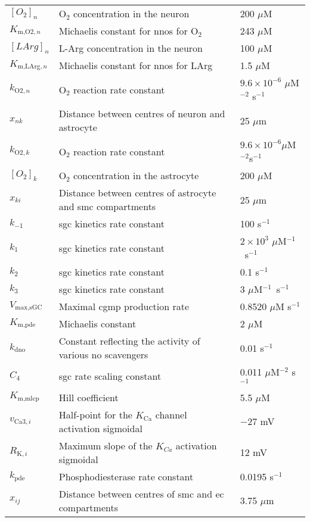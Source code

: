 \documentclass[11pt]{elsarticle}
\newcommand{\mus}{$\mu$M s$^{-1}$\xspace}
\newcommand{\ox}{O$_2$\xspace}
\newcommand{\uM}{$\mu$M\xspace}
\newcommand{\um}{$\mu$m\xspace}
\newcommand{\n}{$^{-1}$\xspace}
\newcommand{\e}[1]{\times 10^{#1}}
\newcommand{\psec}{s$^{-1}$\xspace}
\begin{document}
\begin{longtable}[h!]{ p{0.12\linewidth}   p{0.64\linewidth}   p{0.24\linewidth} }
$ [O_2]_n $ 				& \ox concentration in the neuron 					& 200 \uM 	\\
$ K_{\text{m,O2},n} $ 		& Michaelis constant for \gls{nnos} for \ox  				& 243 \uM \\
$ [LArg]_n $ 				& L-Arg concentration in the neuron 					& 100 \uM 	\\ 
$ K_{\text{m,LArg},n} $ 	& Michaelis constant for \gls{nnos} for LArg 				& 1.5 \uM 	 \\
$ k_{\text{O2},n} $ 		& \ox reaction rate constant							& $9.6\e{-6}$ \uM$^{-2}$ s\n \\
$ x_{nk} $ 					& Distance between centres of neuron and astrocyte  	& 25 \um  \\ 
$ k_{\text{O2},k} $ 	& \ox reaction rate constant							& $9.6\e{-6}$\uM$^{-2}$s\n \\ 
$[O_2]_k$ 				& \ox concentration in the astrocyte & 200 \uM \\
$ x_{ki} $ 				& Distance between centres of astrocyte and \gls{smc} compartments 	& 25 \um \\ 
$ k_{-1} $ 				& \gls{sgc} kinetics rate constant 	& 100 s\n 			 \\ 
$ k_1 $ 				& \gls{sgc} kinetics rate constant 	& $2\e{3}$ \uM\n\ s\n 	 \\ 
$ k_2 $ 				& \gls{sgc} kinetics rate constant 	& 0.1 s\n 			 \\ 
$ k_3 $ 				& \gls{sgc} kinetics rate constant 	& 3 \uM\n\ s\n 		 \\ 
$ V_{\text{max,sGC}} $ 	& Maximal \gls{cgmp} production rate	& 0.8520 \mus  	 \\ 
$ K_{\text{m,pde}} $ 	& Michaelis constant 			& 2 \uM 			 \\ 
$ k_{\text{dno}}$ 		& Constant reflecting the activity of various \gls{no} scavengers & 0.01 s\n \\ 
$ C_4 $ 				& \gls{sgc} rate scaling constant 						& 0.011 \uM$^{-2}$ \psec \\ 
$ K_{\text{m,mlcp}} $ 	& Hill coefficient				& 5.5 \uM 			 \\
$ v_{\text{Ca}3,i} $ 			& Half-point for the $ K_{\text{Ca}} $ channel activation sigmoidal & $-27$ mV \\ 
$ R_{\text{K},i}  $ 				& Maximum slope of the $K_{Ca}$ activation sigmoidal & 12 mV \\ 
$ k_{\text{pde}} $		& Phosphodiesterase rate constant & 0.0195 s\n \\
$ x_{ij} $ 				& Distance between centres of \gls{smc} and \gls{ec} compartments 	& 3.75 \um \\

\end{longtable}
\end{document}
